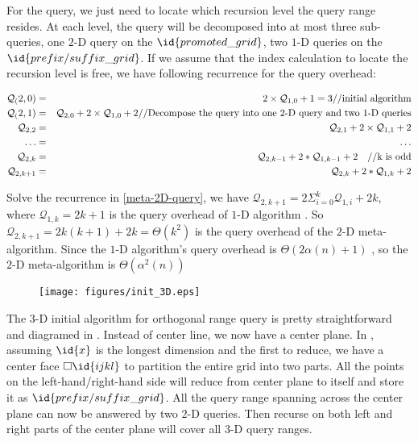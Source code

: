 \begin{IEEEproof}
For the query, we just need to locate which recursion level the query
range resides. At each level, the query will be decomposed into at most
three sub-queries, one $2$-D query on the $\id{promoted\_grid}$, two 
$1$-D queries on the $\id{prefix/suffix\_grid}$. If we assume that the
index calculation to locate the recursion level is free, we have following
recurrence for the query overhead:

\begin{eqnarray}
\mathcal{Q}_(2, 0) & = & 2 \times \mathcal{Q}_{1, 0} + 1 = 3 \hfil \mbox{//initial algorithm}  \\
\mathcal{Q}_(2, 1) & = & \mathcal{Q}_{2, 0} + 2 \times \mathcal{Q}_{1, 0} + 2 
    \hfil \mbox{//Decompose the query into one $2$-D query and two
    $1$-D queries} \\
\mathcal{Q}_{2, 2} & = & \mathcal{Q}_{2, 1} + 2 \times \mathcal{Q}_{1, 1} + 2 \\
\ldots & = & \ldots \\
\mathcal{Q}_{2, k}   & = & \mathcal{Q}_{2, k-1} + 2 * \mathcal{Q}_{1, k-1} + 2 \quad \mbox{//k is odd} \\
\mathcal{Q}_{2, k+1} & = & \mathcal{Q}_{2, k}   + 2 * \mathcal{Q}_{1, k} + 2 
\label{eq:meta-2D-query}
\end{eqnarray}
      
Solve the recurrence in \eqref{meta-2D-query}, we have $\mathcal{Q}_{2,
k+1} = 2 \Sigma_{i=0}^{k} \mathcal{Q}_{1, i} + 2 k$, where
$\mathcal{Q}_{1, k} = 2k + 1$ is the query overhead of $1$-D algorithm
\cite{Seidel06}.  So $\mathcal{Q}_{2, k+1} = 2 k (k+1) + 2k = \Theta(k^2)$
is the query overhead of the $2$-D meta-algorithm. Since the $1$-D
algorithm's query overhead is $\Theta(2 \alpha(n) + 1)$ \cite{Yao82,
Seidel06}, so the $2$-D meta-algorithm is $\Theta(\alpha^2(n))$
\end{IEEEproof}


\begin{figure}[!ht]
\centering
\texttt{[image: figures/init\_3D.eps]}
\label{fig:threed}
\end{figure}

The $3$-D initial algorithm for orthogonal range query is pretty
straightforward and diagramed in . Instead of center line,
we now have a center plane. In , assuming $\id{x}$ is the
longest dimension and the first to reduce, we have a center face $\Box
\id{ijkl}$ to partition the entire grid into two parts. All the points
on the left-hand/right-hand side will reduce from center plane to itself
and store it as $\id{prefix/suffix\_grid}$. All the query range spanning
across the center plane can now be answered by two $2$-D queries. Then
recurse on both left and right parts of the center plane will cover all
$3$-D query ranges.

